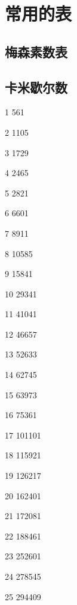 \chapter{常用的表}


\section{梅森素数表}


\section{卡米歇尔数}
1 561

2 1105

3 1729

4 2465

5 2821

6 6601

7 8911

8 10585

9 15841

10 29341

11 41041

12 46657

13 52633

14 62745

15 63973

16 75361

17 101101

18 115921

19 126217

20 162401

21 172081

22 188461

23 252601

24 278545

25 294409